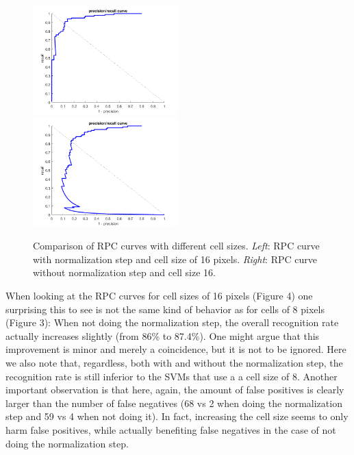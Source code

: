 \documentclass[12pt]{article}
\begin{document}
\begin{enumerate}[a)]
        \begin{figure}[h]			
        	\includegraphics[width=0.5\textwidth]{rpc_norm16}
        	\includegraphics[width=0.5\textwidth]{rpc_not_norm16}
        	\caption{Comparison of RPC curves with different cell sizes. \textit{Left}: RPC curve with normalization step and cell size of 16 pixels. \textit{Right}: RPC curve without normalization step and cell size 16. }
        \end{figure}
        
        When looking at the RPC curves for cell sizes of 16 pixels (Figure 4) one surprising this to see is not the same kind of behavior as for cells of 8 pixels (Figure 3): When not doing the normalization step, the overall recognition rate actually increases slightly (from 86\% to 87.4\%). One might argue that this improvement is minor and merely a coincidence, but it is not to be ignored. Here we also note that, regardless, both with and without the normalization step, the recognition rate is still inferior to the SVMs that use a a cell size of 8. Another important observation is that here, again, the amount of false positives is clearly larger than the number of false negatives (68 vs 2  when doing the normalization step and 59 vs 4 when not doing it). In fact, increasing the cell size seems to only harm false positives, while actually benefiting false negatives in the case of not doing the normalization step.\\
        



\end{enumerate}
\end{document}
